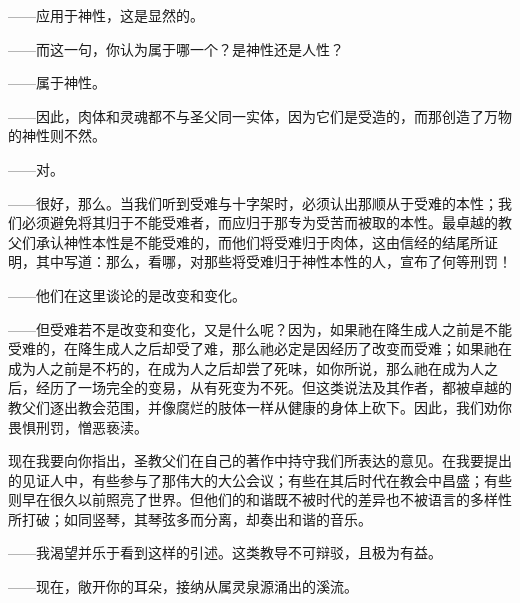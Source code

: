 ——应用于神性，这是显然的。\par

——而这一句，你认为属于哪一个？是神性还是人性？\par

——属于神性。\par

——因此，肉体和灵魂都不与圣父同一实体，因为它们是受造的，而那创造了万物的神性则不然。\par

——对。\par

——很好，那么。当我们听到受难与十字架时，必须认出那顺从于受难的本性；我们必须避免将其归于不能受难者，而应归于那专为受苦而被取的本性。最卓越的教父们承认神性本性是不能受难的，而他们将受难归于肉体，这由信经的结尾所证明，其中写道：那么，看哪，对那些将受难归于神性本性的人，宣布了何等刑罚！\par

——他们在这里谈论的是改变和变化。\par

——但受难若不是改变和变化，又是什么呢？因为，如果祂在降生成人之前是不能受难的，在降生成人之后却受了难，那么祂必定是因经历了改变而受难；如果祂在成为人之前是不朽的，在成为人之后却尝了死味，如你所说，那么祂在成为人之后，经历了一场完全的变易，从有死变为不死。但这类说法及其作者，都被卓越的教父们逐出教会范围，并像腐烂的肢体一样从健康的身体上砍下。因此，我们劝你畏惧刑罚，憎恶亵渎。\par

现在我要向你指出，圣教父们在自己的著作中持守我们所表达的意见。在我要提出的见证人中，有些参与了那伟大的大公会议；有些在其后时代在教会中昌盛；有些则早在很久以前照亮了世界。但他们的和谐既不被时代的差异也不被语言的多样性所打破；如同竖琴，其琴弦多而分离，却奏出和谐的音乐。\par

——我渴望并乐于看到这样的引述。这类教导不可辩驳，且极为有益。\par

——现在，敞开你的耳朵，接纳从属灵泉源涌出的溪流。\par

\par


